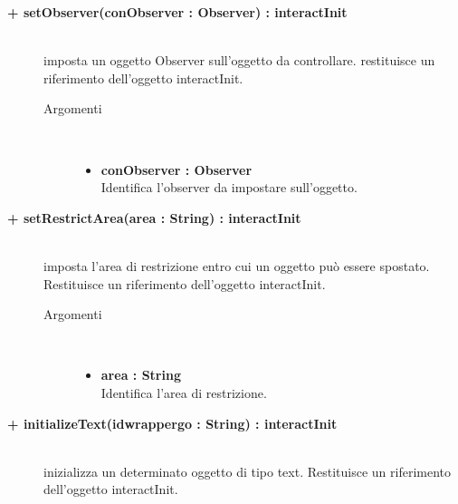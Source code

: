 \begin{description}
\begin{description}
\begin{description}
\begin{itemize}
				\end{itemize}
		\end{description}
	\end{description}		

	\begin{description}
		\item[\textbf{\color{blue}+ setObserver(conObserver : Observer) : interactInit			}] \hfill \\
			imposta un oggetto Observer sull'oggetto da controllare. restituisce un riferimento dell'oggetto interactInit.
			
		\begin{description}
			\item[Argomenti] \hfill \\
				\begin{itemize}
				
					\item \textbf{conObserver : Observer			} \hfill \\
						Identifica l'observer da impostare sull'oggetto.
					
				\end{itemize}
		\end{description}
	\end{description}			

	\begin{description}
		\item[\textbf{\color{blue}+ setRestrictArea(area : String) : interactInit			}] \hfill \\
			imposta l'area di restrizione entro cui un oggetto può essere spostato. Restituisce un riferimento dell'oggetto interactInit.
			
		\begin{description}
			\item[Argomenti] \hfill \\
				\begin{itemize}
				
					\item \textbf{area : String			} \hfill \\
						Identifica l'area di restrizione.
					
				\end{itemize}
		\end{description}
	\end{description}
	
		\begin{description}
		\item[\textbf{\color{blue}+ initializeText(idwrappergo : String) : interactInit			}] \hfill \\
			inizializza un determinato oggetto di tipo text. Restituisce un riferimento dell'oggetto interactInit.
			

\end{description}
\end{description}
